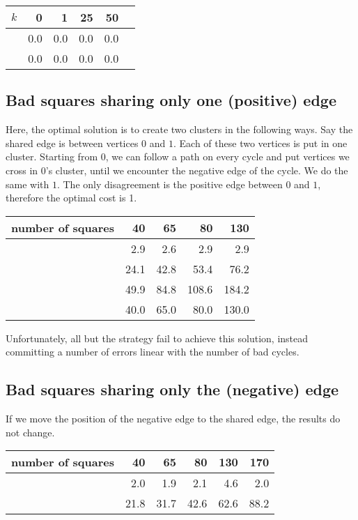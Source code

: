 \begin{center}
\begin{tabular}{lrrrrr}
\toprule
$k$ &   0  &   1  &   25 &   50  \\
\midrule
\pot{} & 0.0 & 0.0 & 0.0 & 0.0  \\
\pat{} &  0.0 &  0.0 & 0.0 & 0.0  \\
\bottomrule
\end{tabular}
\end{center}

\subsection{Bad squares sharing only one (positive) edge}
\label{sub:squares}
Here, the optimal solution is to create two clusters in the following ways.
Say the shared edge is between vertices $0$ and $1$. Each of these two
vertices is put in one cluster. Starting from $0$, we can follow a path on
every cycle and put vertices we cross in $0$'s cluster, until we encounter the
negative edge of the cycle. We do the same with $1$. The only disagreement is
the positive edge between $0$ and $1$, therefore the optimal cost is 1.

\begin{center}
\begin{tabular}{lrrrr}
\toprule
number of squares & 40   & 65   & 80    & 130 \\
\midrule
\pot{}            & 2.9  & 2.6  & 2.9   & 2.9 \\
\pat{}            & 24.1 & 42.8 & 53.4  & 76.2 \\
\nnot{}           & 49.9 & 84.8 & 108.6 & 184.2 \\
\nat{}            & 40.0 & 65.0 & 80.0  & 130.0\\
\bottomrule
\end{tabular}
\end{center}

Unfortunately, all but the \pot{} strategy fail to achieve this solution,
instead committing a number of errors linear with the number of bad cycles.


\subsection{Bad squares sharing only the (negative) edge}

If we move the position of the negative edge to the shared edge, the results
do not change.

\begin{center}
\begin{tabular}{lrrrrr}
\toprule
number of squares &  40  &  65  &  80  &  130 &  170 \\
\midrule
\pot{} &  2.0 &  1.9 &  2.1 &  4.6 &  2.0 \\
\pat{} & 21.8 & 31.7 & 42.6 & 62.6 & 88.2 \\
\bottomrule
\end{tabular}
\end{center}

